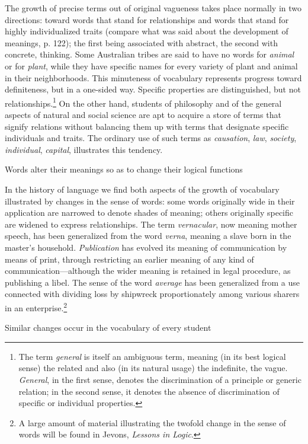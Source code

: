 \documentclass[letterpaper]{book}
\begin{document}
The growth of precise terms out of original vagueness takes place
normally in two directions: toward words that stand for relationships
and words that stand for highly individualized traits (compare what was
said about the development of meanings, p. 122); the first being
associated with abstract, the second with concrete, thinking. Some
Australian tribes are said to have no words for \emph{animal} or for
\emph{plant}, while they have specific names for every variety of plant
and animal in their neighborhoods. This minuteness of vocabulary
represents
progress toward definiteness, but in a one-sided way. Specific
properties are distinguished, but not
relationships.\footnote{
The term \emph{general} is itself an ambiguous term, meaning (in its
best logical sense) the related and also (in its natural usage) the
indefinite, the vague. \emph{General}, in the first sense, denotes the
discrimination of a principle or generic relation; in the second sense,
it denotes the absence of discrimination of specific or individual
properties.
}
On the other hand, students of philosophy and of the general aspects of
natural and social science are apt to acquire a store of terms that
signify relations without balancing them up with terms that designate
specific individuals and traits. The ordinary use of such terms as
\emph{causation}, \emph{law}, \emph{society}, \emph{individual},
\emph{capital}, illustrates this tendency.

Words alter their meanings so as to change their logical functions

In the history of language we find both aspects of the growth of
vocabulary illustrated by changes in the sense of words: some words
originally wide in their application are narrowed to denote shades of
meaning; others originally specific are widened to express
relationships. The term \emph{vernacular}, now meaning mother speech,
has been generalized from the word \emph{verna}, meaning a slave born in
the master's household. \emph{Publication} has evolved its meaning of
communication by means of print, through restricting an earlier meaning
of any kind of communication---although the wider meaning is retained in
legal procedure, as publishing a libel. The sense of the word
\emph{average} has been generalized from a use connected with dividing
loss by shipwreck proportionately among various sharers in an
enterprise.\footnote{
A large amount of material illustrating the twofold change in the sense
of words will be found in Jevons, \emph{Lessons in Logic}.
}

Similar changes occur in the vocabulary of every student
\end{document}
